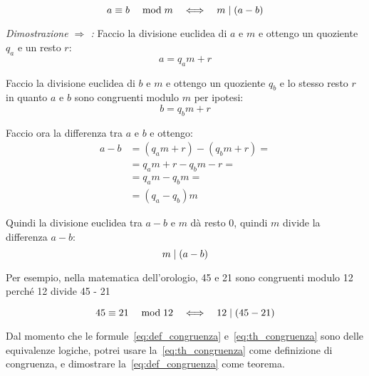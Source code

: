    \begin{teorema}
        \label{th:congruenza}
        \begin{equation}
            \label{eq:th_congruenza}  a \equiv b \quad\bmod m   \quad\Longleftrightarrow\quad  m  \mid  (a - b)
        \end{equation}
    \end{teorema}
    \begin{dimostrazione}
        \emph{Dimostrazione $\Longrightarrow$ :}
        Faccio la divisione euclidea di $a$ e $m$ e ottengo un quoziente $q_a$ e un resto $r$:
        \begin{equation*}
            a = q_a m + r
        \end{equation*}

        Faccio la divisione euclidea di $b$ e $m$ e ottengo un quoziente $q_b$ e lo stesso resto $r$ in quanto $a$ e $b$ sono congruenti modulo $m$ per ipotesi:
        \begin{equation*}
            b = q_b m + r
        \end{equation*}

        Faccio ora la differenza tra $a$ e $b$ e ottengo:
        \begin{align*}
            a - b &= (q_a m + r) - (q_b m + r) = \\
            &= q_a m + r - q_b m - r = \\
            &= q_a m - q_b m = \\
            &= (q_a - q_b)m
        \end{align*}

        Quindi la divisione euclidea tra $a - b$ e $m$ dà resto 0, quindi $m$ divide la differenza $a - b$:
        \begin{equation*}
            m  \mid  (a - b)
        \end{equation*}
    \end{dimostrazione}

Per esempio, nella matematica dell'orologio, 45 e 21 sono congruenti modulo 12 perché 12 divide 45 - 21

\begin{equation*}
     45 \equiv 21 \quad\bmod 12   \quad\Longleftrightarrow\quad  12  \mid  (45 - 21)
\end{equation*}

Dal momento che le formule~\eqref{eq:def_congruenza} e~\eqref{eq:th_congruenza} sono delle equivalenze logiche, potrei usare la~\eqref{eq:th_congruenza} come definizione di congruenza, e dimostrare la~\eqref{eq:def_congruenza} come teorema.


